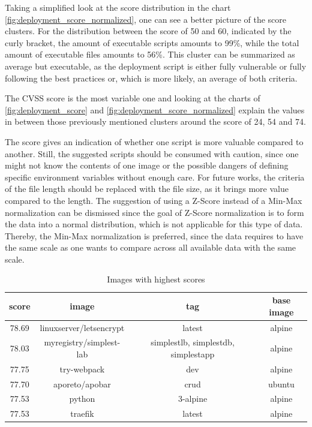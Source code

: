 Taking a simplified look at the score distribution in the chart \ref{fig:deployment_score_normalized}, one can see a better picture of the score clusters. For the distribution between the score of 50 and 60, indicated by the curly bracket, the amount of executable scripts amounts to 99\%, while the total amount of executable files amounts to 56\%. This cluster can be summarized as average but executable, as the deployment script is either fully vulnerable or fully following the best practices or, which is more likely, an average of both criteria.

The CVSS score is the most variable one and looking at the charts of \ref{fig:deployment_score} and \ref{fig:deployment_score_normalized} explain the values in between those previously mentioned clusters around the score of 24, 54 and 74.

The score gives an indication of whether one script is more valuable compared to another. Still, the suggested scripts should be consumed with caution, since one might not know the contents of one image or the possible dangers of defining specific environment variables without enough care.
For future works, the criteria of the file length should be replaced with the file size, as it brings more value compared to the length. The suggestion of using a Z-Score instead of a Min-Max normalization can be dismissed since the goal of Z-Score normalization is to form the data into a normal distribution, which is not applicable for this type of data. Thereby, the Min-Max normalization is preferred, since the data requires to have the same scale as one wants to compare across all available data with the same scale.

\begin{table}[h!]
    \centering
    \begin{tabular}{ |c|c|c|c| }
    \hline
    score & image & tag & base image \\
    \hline
         78.69 & linuxserver/letsencrypt & latest & alpine \\
         78.03 & myregistry/simplest-lab & simplestlb, simplestdb, simplestapp & alpine \\
         77.75 & try-webpack & dev & alpine\\
         77.70 & aporeto/apobar & crud & ubuntu \\
         77.53 & python & 3-alpine & alpine\\
         77.53 & traefik & latest & alpine\\
    \hline
    \end{tabular}
    \caption{Images with highest scores}
    \label{images_with_highest_score}
\end{table}

